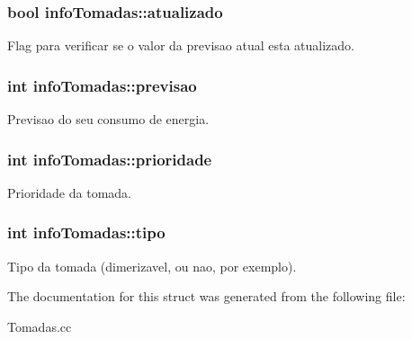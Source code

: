 \subsubsection[{\texorpdfstring{atualizado}{atualizado}}]{\setlength{\rightskip}{0pt plus 5cm}bool info\+Tomadas\+::atualizado}\hypertarget{structinfo_tomadas_acfb2f84158916a08581c25a776c11508}{}\label{structinfo_tomadas_acfb2f84158916a08581c25a776c11508}
Flag para verificar se o valor da previsao atual esta atualizado. 
\subsubsection[{\texorpdfstring{previsao}{previsao}}]{\setlength{\rightskip}{0pt plus 5cm}int info\+Tomadas\+::previsao}\hypertarget{structinfo_tomadas_add29a4ea588c1198cb91cf38f40b9451}{}\label{structinfo_tomadas_add29a4ea588c1198cb91cf38f40b9451}
Previsao do seu consumo de energia. 
\subsubsection[{\texorpdfstring{prioridade}{prioridade}}]{\setlength{\rightskip}{0pt plus 5cm}int info\+Tomadas\+::prioridade}\hypertarget{structinfo_tomadas_ad89b1b21b89123c84749332412f8c59a}{}\label{structinfo_tomadas_ad89b1b21b89123c84749332412f8c59a}
Prioridade da tomada. 
\subsubsection[{\texorpdfstring{tipo}{tipo}}]{\setlength{\rightskip}{0pt plus 5cm}int info\+Tomadas\+::tipo}\hypertarget{structinfo_tomadas_a32cbb496aac12684a1365fd265bf6ff1}{}\label{structinfo_tomadas_a32cbb496aac12684a1365fd265bf6ff1}
Tipo da tomada (dimerizavel, ou nao, por exemplo). 

The documentation for this struct was generated from the following file\+:\begin{DoxyCompactItemize}
\item 
Tomadas.\+cc\end{DoxyCompactItemize}
